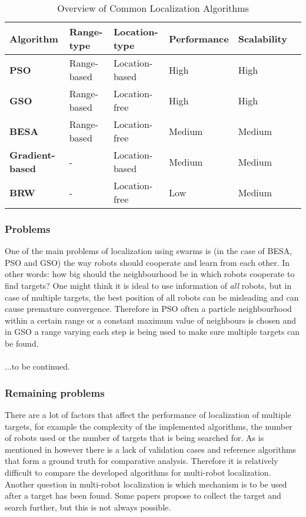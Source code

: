 	\begin{table}[h]
  \renewcommand{\arraystretch}{1.3}
  \label{table_example}
  \centering
    \begin{tabular}{|l|l|l|l|l|l|}
    \hline
    \bfseries Algorithm & Range-type & Location-type & Performance & Scalability\\
    \hline
    \bfseries PSO & Range-based & Location-based & High & High\\
    \hline
    \bfseries GSO & Range-based & Location-free & High & High\\
    \hline
    \bfseries BESA & Range-based & Location-free & Medium & Medium\\
    \hline
    \bfseries Gradient-based & - & Location-based & Medium & Medium\\
    \hline
    \bfseries BRW & - & Location-free & Low & Medium\\
    \hline
    \end{tabular}
  \caption{Overview of Common Localization Algorithms}
  \end{table}

	\subsubsection{Problems}
	One of the main problems of localization using swarms is (in the case of BESA, PSO and GSO) the way robots should cooperate and learn from each other. In other words: how big should the neighbourhood be in which robots cooperate to find targets? One might think it is ideal to use information of \emph{all} robots, but in case of multiple targets, the best position of all robots can be misleading and can cause premature convergence. Therefore in PSO often a particle neighbourhood within a certain range or a constant maximum value of neighbours is chosen and in GSO a range varying each step is being used to make sure multiple targets can be found.\\
	\\
	...to be continued.

	\subsubsection{Remaining problems}
	There are a lot of factors that affect the performance of localization of multiple targets, for example the complexity of the implemented algorithms, the number of robots used or the number of targets that is being searched for. As is mentioned in \cite{mcgill2011robot} however there is a lack of validation cases and reference algorithms that form a ground truth for comparative analysis. Therefore it is relatively difficult to compare the developed algorithms for multi-robot localization. Another question in multi-robot localization is which mechanism is to be used after a target has been found. Some papers propose to collect the target and search further, but this is not always possible.